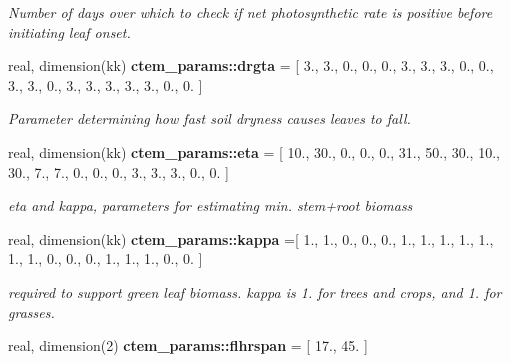 \begin{DoxyCompactItemize}
\begin{DoxyCompactList}\small\item\em Number of days over which to check if net photosynthetic rate is positive before initiating leaf onset. \end{DoxyCompactList}\item 
\hypertarget{namespacectem__params_ad4b4b2e3174bff5d48329ff00f79da67}{}real, dimension(kk) {\bfseries ctem\+\_\+params\+::drgta} = \mbox{[} 3., 3., 0., 0., 0., 3., 3., 3., 0., 0., 3., 3., 0., 3., 3., 3., 3., 3., 0., 0. \mbox{]}\label{namespacectem__params_ad4b4b2e3174bff5d48329ff00f79da67}

\begin{DoxyCompactList}\small\item\em Parameter determining how fast soil dryness causes leaves to fall. \end{DoxyCompactList}\item 
\hypertarget{namespacectem__params_af316f76bee6244c68e937ed9e399bbd0}{}real, dimension(kk) {\bfseries ctem\+\_\+params\+::eta} = \mbox{[} 10., 30., 0., 0., 0., 31., 50., 30., 10., 30., 7., 7., 0., 0., 0., 3., 3., 3., 0., 0. \mbox{]}\label{namespacectem__params_af316f76bee6244c68e937ed9e399bbd0}

\begin{DoxyCompactList}\small\item\em eta and kappa, parameters for estimating min. stem+root biomass \end{DoxyCompactList}\item 
\hypertarget{namespacectem__params_a31cd33c14ab64d6e347e8fa8649c0ac8}{}real, dimension(kk) {\bfseries ctem\+\_\+params\+::kappa} =\mbox{[} 1., 1., 0., 0., 0., 1., 1., 1., 1., 1., 1., 1., 0., 0., 0., 1., 1., 1., 0., 0. \mbox{]}\label{namespacectem__params_a31cd33c14ab64d6e347e8fa8649c0ac8}

\begin{DoxyCompactList}\small\item\em required to support green leaf biomass. kappa is 1. for trees and crops, and 1. for grasses. \end{DoxyCompactList}\item 
\hypertarget{namespacectem__params_a766b351a6a0cf14bfa75068e43a300da}{}real, dimension(2) {\bfseries ctem\+\_\+params\+::flhrspan} = \mbox{[} 17., 45. \mbox{]}\label{namespacectem__params_a766b351a6a0cf14bfa75068e43a300da}


\end{DoxyCompactItemize}
